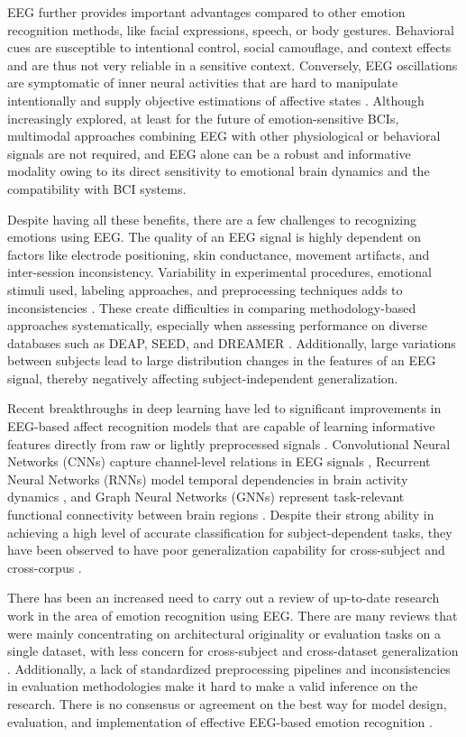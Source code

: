 \documentclass{WileyMSP-template}
\begin{document}
EEG further provides important advantages compared to other emotion recognition methods, like facial expressions, speech, or body gestures. Behavioral cues are susceptible to intentional control, social camouflage, and context effects and are thus not very reliable in a sensitive context.  Conversely, EEG oscillations are symptomatic of inner neural activities that are hard to manipulate intentionally and supply objective estimations of affective states \cite{craik2019deep}. Although increasingly explored, at least for the future of emotion-sensitive BCIs, multimodal approaches combining EEG with other physiological or behavioral signals are not required, and EEG alone can be a robust and informative modality owing to its direct sensitivity to emotional brain dynamics and the compatibility with BCI systems.

Despite having all these benefits, there are a few challenges to recognizing emotions using EEG. The quality of an EEG signal is highly dependent on factors like electrode positioning, skin conductance, movement artifacts, and inter-session inconsistency. Variability in experimental procedures, emotional stimuli used, labeling approaches, and preprocessing techniques adds to inconsistencies \cite{alotaiby2017review}. These create difficulties in comparing methodology-based approaches systematically, especially when assessing performance on diverse databases such as DEAP, SEED, and DREAMER \cite{koelstra2012deap,katsigiannis2017dreamer}. Additionally, large variations between subjects lead to large distribution changes in the features of an EEG signal, thereby negatively affecting subject-independent generalization.

Recent breakthroughs in deep learning have led to significant improvements in EEG-based affect recognition models that are capable of learning informative features directly from raw or lightly preprocessed signals \cite{craik2019deep}. Convolutional Neural Networks (CNNs) capture channel-level relations in EEG signals \cite{li2018cnn}, Recurrent Neural Networks (RNNs) model temporal dependencies in brain activity dynamics \cite{yang2018rnn}, and Graph Neural Networks (GNNs) represent task-relevant functional connectivity between brain regions \cite{wang2022gcn}. Despite their strong ability in achieving a high level of accurate classification for subject-dependent tasks, they have been observed to have poor generalization capability for cross-subject and cross-corpus \cite{zhang2021cross}.

There has been an increased need to carry out a review of up-to-date research work in the area of emotion recognition using EEG. There are many reviews that were mainly concentrating on architectural originality or evaluation tasks on a single dataset, with less concern for cross-subject and cross-dataset generalization \cite{alotaiby2017review,craik2019deep}. Additionally, a lack of standardized preprocessing pipelines and inconsistencies in evaluation methodologies make it hard to make a valid inference \cite{peerjreview2023} on the research. There is no consensus or agreement on the best way for model design, evaluation, and implementation of effective EEG-based emotion recognition \cite{springerreview2024}.
\end{document}

